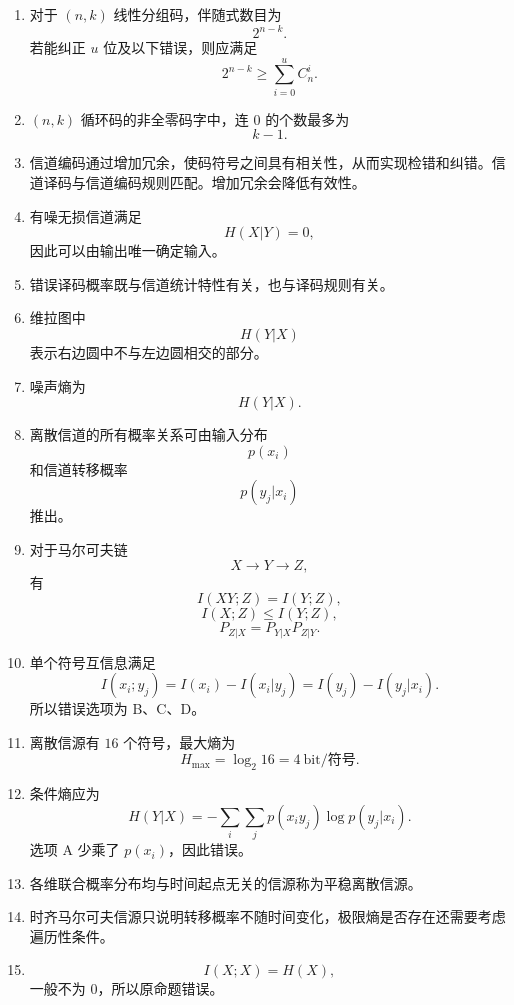 \documentclass[UTF8,a4paper,12pt]{ctexart}
\begin{document}
\begin{enumerate}[label=\arabic*., leftmargin=2em]
\item 对于 $(n,k)$ 线性分组码，伴随式数目为
\[
2^{n-k}.
\]
若能纠正 $u$ 位及以下错误，则应满足
\[
2^{n-k}\geq \sum_{i=0}^{u}C_n^i.
\]

\item $(n,k)$ 循环码的非全零码字中，连 $0$ 的个数最多为
\[
k-1.
\]

\item 信道编码通过增加冗余，使码符号之间具有相关性，从而实现检错和纠错。信道译码与信道编码规则匹配。增加冗余会降低有效性。

\item 有噪无损信道满足
\[
H(X|Y)=0,
\]
因此可以由输出唯一确定输入。

\item 错误译码概率既与信道统计特性有关，也与译码规则有关。

\item 维拉图中
\[
H(Y|X)
\]
表示右边圆中不与左边圆相交的部分。

\item 噪声熵为
\[
H(Y|X).
\]

\item 离散信道的所有概率关系可由输入分布
\[
p(x_i)
\]
和信道转移概率
\[
p(y_j|x_i)
\]
推出。

\item 对于马尔可夫链
\[
X\to Y\to Z,
\]
有
\[
I(XY;Z)=I(Y;Z),
\]
\[
I(X;Z)\leq I(Y;Z),
\]
\[
P_{Z|X}=P_{Y|X}P_{Z|Y}.
\]

\item 单个符号互信息满足
\[
I(x_i;y_j)=I(x_i)-I(x_i|y_j)
=I(y_j)-I(y_j|x_i).
\]
所以错误选项为 B、C、D。

\item 离散信源有 $16$ 个符号，最大熵为
\[
H_{\max}=\log_2 16=4\ \text{bit/符号}.
\]

\item 条件熵应为
\[
H(Y|X)=-\sum_i\sum_j p(x_i y_j)\log p(y_j|x_i).
\]
选项 A 少乘了 $p(x_i)$，因此错误。

\item 各维联合概率分布均与时间起点无关的信源称为平稳离散信源。

\item 时齐马尔可夫信源只说明转移概率不随时间变化，极限熵是否存在还需要考虑遍历性条件。

\item
\[
I(X;X)=H(X),
\]
一般不为 $0$，所以原命题错误。
\end{enumerate}
\end{document}
